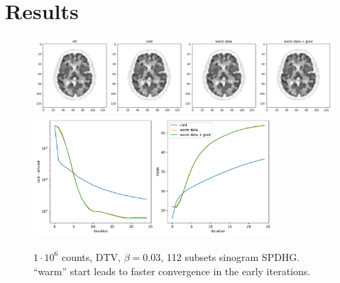 

\section{Results}

\begin{figure}
  \centering
    \includegraphics[width=1.0\textwidth]{figs/SPDHG_sino_init.png}
    \includegraphics[width=0.8\textwidth]{figs/SPDHG_sino_init_metrics.pdf}
  \caption{$1\cdot10^6$ counts, DTV, $\beta = 0.03$, 112 subsets sinogram SPDHG. ``warm'' start leads to faster convergence in the early iterations.}
  \label{fig:metrics}
\end{figure}


